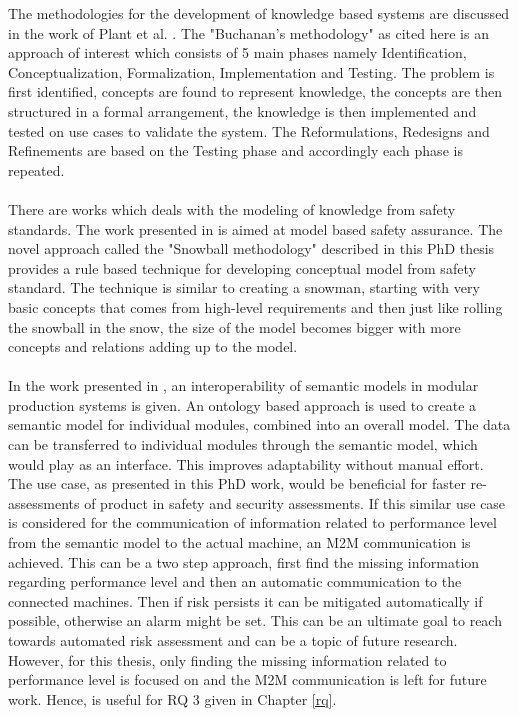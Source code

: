 The methodologies for the development of knowledge based systems are discussed in the work of Plant et al. \cite{Plant2003}. The "Buchanan's methodology" as cited here is an approach of interest which consists of 5 main phases namely Identification, Conceptualization, Formalization, Implementation and Testing. The problem is first identified, concepts are found to represent knowledge, the concepts are then structured in a formal arrangement, the knowledge is then implemented and tested on use cases to validate the system. The Reformulations, Redesigns and Refinements are based on the Testing phase and accordingly each phase is repeated. 

\paragraph{} There are works which deals with the modeling of knowledge from safety standards. The work presented in \cite{Luo2016} is aimed at model based safety assurance. The novel approach called the "Snowball methodology" described in this PhD thesis provides a rule based technique for developing conceptual model from safety standard. The technique is similar to creating a snowman, starting with very basic concepts that comes from high-level requirements and then just like rolling the snowball in the snow, the size of the model becomes bigger with more concepts and relations adding up to the model.

\paragraph{} In the work presented in \cite{Bunte2020}, an interoperability of semantic models in modular production systems is given. An ontology based approach is used to create a semantic model for individual modules, combined into an overall model. The data can be transferred to individual modules through the semantic model, which would play as an interface. This improves adaptability without manual effort. The use case, as presented in this PhD work, would be beneficial for faster re-assessments of product in safety and security assessments. If this similar use case is considered for the communication of information related to performance level from the semantic model to the actual machine, an M2M communication is achieved. This can be a two step approach, first find the missing information regarding performance level and then an automatic communication to the connected machines. Then if risk persists it can be mitigated automatically if possible, otherwise an alarm might be set. This can be an ultimate goal to reach towards automated risk assessment and can be a topic of future research. However, for this thesis, only finding the missing information related to performance level is focused on and the M2M communication is left for future work. Hence, \cite{Bunte2020} is useful for RQ 3 given in Chapter \ref{rq}.

